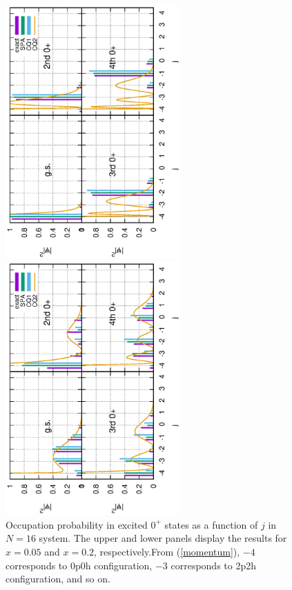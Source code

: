 \documentclass[%
superscriptaddress,
preprint,
showpacs,
nofootinbib,
amsmath,amssymb,
prc,
floatfix ]%
{revtex4-1}
\begin{document}
\begin{figure}[htbp]
 \begin{minipage}{1\hsize}
 \begin{center}
  \includegraphics[width=67mm,angle=-90]{images/N16Xeq0p5occ.eps}
 \end{center}
 \end{minipage}
 \begin{minipage}{1\hsize}
 \begin{center}
  \includegraphics[width=67mm,angle=-90]{images/N16Xeq2occ.eps}
 \end{center}
 \end{minipage}
 \caption{Occupation probability in excited $0^+$ states as a function of $j$ in $N=16$ system. The upper and lower panels display the results for $x=0.05$ and $x=0.2$, respectively.From (\ref{momentum}), $-4$ corresponds to 0p0h configuration, $-3$ corresponds to 2p2h configuration, and so on.}
 \label{fig:N16_occ}
\end{figure}
\end{document}
